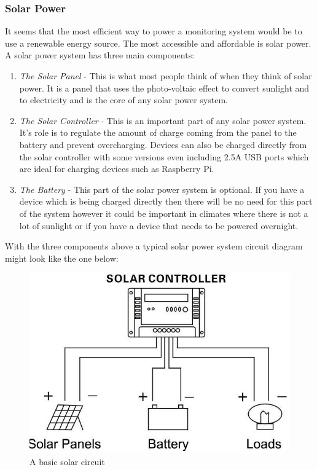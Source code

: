 \documentclass[10pt,a4paper]{article}
\begin{document}
\subsubsection{Solar Power}
It seems that the most efficient way to power a monitoring system would be to use a renewable energy source. The most accessible and affordable is solar power. A solar power system has three main components: 
\begin{enumerate}
\item\textit{The Solar Panel} - This is what most people think of when they think of solar power. It is a panel that uses the photo-voltaic effect to convert sunlight and to electricity and is the core of any solar power system.
\item\textit{The Solar Controller} - This is an important part of any solar power system. It's role is to regulate the amount of charge coming from the panel to the battery and prevent overcharging\cite{website:energymatters}. Devices can also be charged directly from the solar controller with some versions even including 2.5A USB ports which are ideal for charging devices such as Raspberry Pi.
\item\textit{The Battery} - This part of the solar power system is optional. If you have a device which is being charged directly then there will be no need for this part of the system however it could be important in climates where there is not a lot of sunlight or if you have a device that needs to be powered overnight.
\end{enumerate}

With the three components above a typical solar power system circuit diagram might look like the one below: 

\begin{figure}[H]
\centering
  \includegraphics[width=\linewidth]{images/solarcircuit.jpg}
  \caption{A basic solar circuit\cite{website:edgefx}}
  \label{fig:solarcircuit}
\end{figure}
\end{document}
